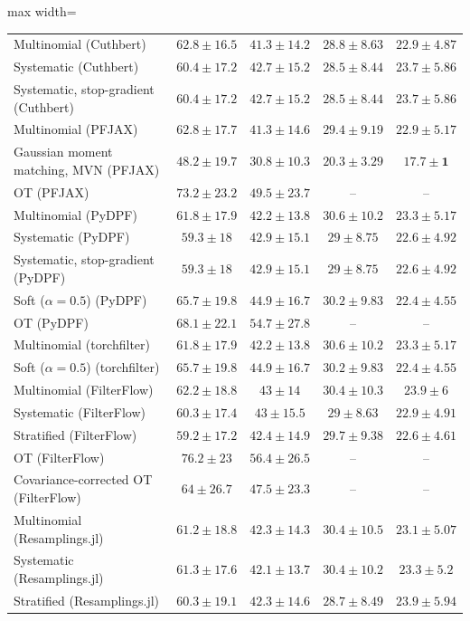 \begin{table}[H]
\begin{adjustbox}{max width=\linewidth}
\begin{tabular}{lcccc}
Multinomial (Cuthbert) & $62.8\pm16.5$ & $41.3\pm14.2$ & $28.8\pm8.63$ & $22.9\pm4.87$ \\
Systematic (Cuthbert) & $60.4\pm17.2$ & $42.7\pm15.2$ & $28.5\pm8.44$ & $23.7\pm5.86$ \\
Systematic, stop-gradient (Cuthbert) & $60.4\pm17.2$ & $42.7\pm15.2$ & $28.5\pm8.44$ & $23.7\pm5.86$ \\
Multinomial (PFJAX) & $62.8\pm17.7$ & $41.3\pm14.6$ & $29.4\pm9.19$ & $22.9\pm5.17$ \\
Gaussian moment matching, MVN (PFJAX) & $\mathbf{48.2\pm19.7}$ & $\mathbf{30.8\pm10.3}$ & $\mathbf{20.3\pm3.29}$ & $\mathbf{17.7\pm1}$ \\
OT (PFJAX) & $73.2\pm23.2$ & $49.5\pm23.7$ & -- & -- \\
Multinomial (PyDPF) & $61.8\pm17.9$ & $42.2\pm13.8$ & $30.6\pm10.2$ & $23.3\pm5.17$ \\
Systematic (PyDPF) & $59.3\pm18$ & $42.9\pm15.1$ & $29\pm8.75$ & $22.6\pm4.92$ \\
Systematic, stop-gradient (PyDPF) & $59.3\pm18$ & $42.9\pm15.1$ & $29\pm8.75$ & $22.6\pm4.92$ \\
Soft ($\alpha{=}0.5$) (PyDPF) & $65.7\pm19.8$ & $44.9\pm16.7$ & $30.2\pm9.83$ & $22.4\pm4.55$ \\
OT (PyDPF) & $68.1\pm22.1$ & $54.7\pm27.8$ & -- & -- \\
Multinomial (torchfilter) & $61.8\pm17.9$ & $42.2\pm13.8$ & $30.6\pm10.2$ & $23.3\pm5.17$ \\
Soft ($\alpha{=}0.5$) (torchfilter) & $65.7\pm19.8$ & $44.9\pm16.7$ & $30.2\pm9.83$ & $22.4\pm4.55$ \\
Multinomial (FilterFlow) & $62.2\pm18.8$ & $43\pm14$ & $30.4\pm10.3$ & $23.9\pm6$ \\
Systematic (FilterFlow) & $60.3\pm17.4$ & $43\pm15.5$ & $29\pm8.63$ & $22.9\pm4.91$ \\
Stratified (FilterFlow) & $59.2\pm17.2$ & $42.4\pm14.9$ & $29.7\pm9.38$ & $22.6\pm4.61$ \\
OT (FilterFlow) & $76.2\pm23$ & $56.4\pm26.5$ & -- & -- \\
Covariance-corrected OT (FilterFlow) & $64\pm26.7$ & $47.5\pm23.3$ & -- & -- \\
Multinomial (Resamplings.jl) & $61.2\pm18.8$ & $42.3\pm14.3$ & $30.4\pm10.5$ & $23.1\pm5.07$ \\
Systematic (Resamplings.jl) & $61.3\pm17.6$ & $42.1\pm13.7$ & $30.4\pm10.2$ & $23.3\pm5.2$ \\
Stratified (Resamplings.jl) & $60.3\pm19.1$ & $42.3\pm14.6$ & $28.7\pm8.49$ & $23.9\pm5.94$ \\

\end{tabular}
\end{adjustbox}
\end{table}
